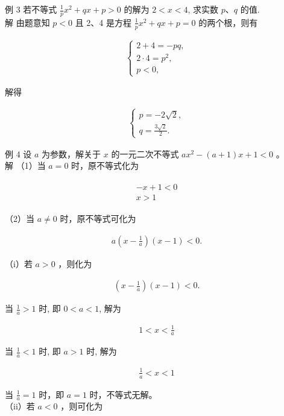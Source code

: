 \documentclass[10pt]{article}
\begin{document}
例 3 若不等式 $\frac{1}{p} x^{2}+q x+p>0$ 的解为 $2<x<4$, 求实数 $p 、 q$ 的值.\\
解 由题意知 $p<0$ 且 2、4 是方程 $\frac{1}{p} x^{2}+q x+p=0$ 的两个根，则有

\begin{align*}
\left\{\begin{array}{l}
2+4=-p q, \\
2 \cdot 4=p^{2}, \\
p<0,
\end{array}\right.
\end{align*}

解得

\begin{align*}
\left\{\begin{array}{l}
p=-2 \sqrt{2}, \\
q=\frac{3 \sqrt{2}}{2} .
\end{array}\right.
\end{align*}

例 4 设 $a$ 为参数，解关于 $x$ 的一元二次不等式 $a x^{2}-(a+1) x+1<0$ 。\\
解 （1）当 $a=0$ 时，原不等式化为

\begin{align*}
\begin{gathered}
-x+1<0 \\
x>1
\end{gathered}
\end{align*}

（2）当 $a \neq 0$ 时，原不等式可化为

\begin{align*}
a\left(x-\frac{1}{a}\right)(x-1)<0 .
\end{align*}

（i）若 $a>0$ ，则化为

\begin{align*}
\left(x-\frac{1}{a}\right)(x-1)<0 .
\end{align*}

当 $\frac{1}{a}>1$ 时, 即 $0<a<1$, 解为

\begin{align*}
1<x<\frac{1}{a}
\end{align*}

当 $\frac{1}{a}<1$ 时, 即 $a>1$ 时, 解为

\begin{align*}
\frac{1}{a}<x<1
\end{align*}

当 $\frac{1}{a}=1$ 时，即 $a=1$ 时，不等式无解。\\
（ii）若 $a<0$ ，则可化为
\end{document}
